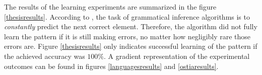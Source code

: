 The results of the learning experiments are summarized in the figure \ref{thesisresults}.
According to \cite{DeLaHiguera2010}, the task of grammatical inference algorithms is to \emph{constantly} predict the next correct element.
Therefore, the algorithm did not fully learn the pattern if it is still making errors, no matter how negligibly rare those errors are.
Figure \ref{thesisresults} only indicates successful learning of the pattern if the achieved accuracy was $100\%$.
A gradient representation of the experimental outcomes can be found in figures \ref{languagesresults} and \ref{ostiaresults}.

\begin{table}[h!]
\centering
{}
\end{table}
